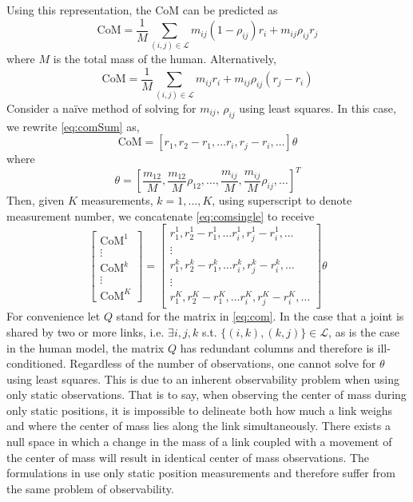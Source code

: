 Using this representation, the CoM  can be predicted as
\begin{equation}
\text{CoM} = \frac{1}{M}\sum_{(i,j)\in\mathcal{L}} m_{ij}(1-\rho_{ij})r_i + m_{ij}\rho_{ij}r_j
\end{equation}
where $M$ is the total mass of the human. Alternatively, 
\begin{equation}
\text{CoM} = \frac{1}{M}\sum_{(i,j)\in\mathcal{L}} m_{ij} r_i + m_{ij}\rho_{ij}(r_j - r_i) \label{eq:comSum}
\end{equation}
Consider a na\"ive method of solving for $m_{ij}$, $\rho_{ij}$ using least squares. In this case, we rewrite \eqref{eq:comSum} as, 
\begin{equation}
\text{CoM} = [r_1,  r_2 - r_1, \hdots r_i, r_j - r_i, \hdots] \theta \label{eq:comsingle}
\end{equation}
where
\begin{equation}
\theta = [\frac{m_{12}}{M}, \frac{m_{12}}{M}\rho_{12}, \hdots, \frac{m_{ij}}{M}, \frac{m_{ij}}{M}\rho_{ij}, \hdots]^T \nonumber
\end{equation}
Then, given $K$ measurements, $k = 1,\hdots, K$, using superscript to denote measurement number, we concatenate \eqref{eq:comsingle} to receive
\begin{equation}
\begin{bmatrix}
\text{CoM}^1\\
\vdots \\
\text{CoM}^k \\
\vdots \\
\text{CoM}^K
\end{bmatrix}
= 
\begin{bmatrix}
r_1^1,  r_2^1 - r_1^1, \hdots r_i^1, r_j^1 - r_i^1, \hdots  \\
\vdots \\
r_1^k,  r_2^k - r_1^k, \hdots r_i^k, r_j^k - r_i^k, \hdots  \\
\vdots \\
r_1^K,  r_2^K - r_1^K, \hdots r_i^K, r_j^K - r_i^K, \hdots 
\end{bmatrix}
\theta
\label{eq:com}
\end{equation}
For convenience let $Q$ stand for the matrix in \eqref{eq:com}. In the case that a joint is shared by two or more links, i.e. $\exists i,j,k$ s.t. $\{(i,k),(k,j)\} \in \mathcal{L}$, as is the case in the human model, the matrix $Q$ has redundant columns and therefore is ill-conditioned. Regardless of the number of observations, one cannot solve for $\theta$ using least squares. 
This is due to an inherent observability problem when using only static observations. That is to say, when observing the center of mass during only static positions, it is impossible to delineate both how much a link weighs and where the center of mass lies along the link simultaneously. There exists a null space in which a change in the mass of a link coupled with a movement of the center of mass will result in identical center of mass observations. 
The formulations in \cite{gonzalez2012estimation, cotton2011estimation} use only static position measurements and therefore suffer from the same problem of observability. 
